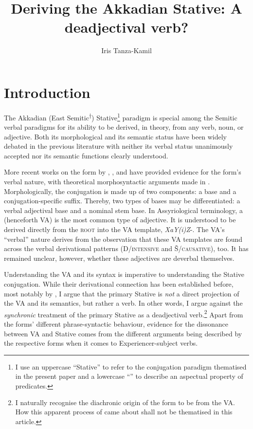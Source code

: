 \documentclass[output=paper,colorlinks,citecolor=brown]{langscibook}
\author{Iris Tanza-Kamil\orcid{}\affiliation{The Hebrew University of Jerusalem}}
\title{Deriving the Akkadian Stative: A deadjectival verb?}
\begin{document}
\maketitle


\section{Introduction}
\label{sec:introduction}

The Akkadian (East Semitic\textsuperscript{$\dagger$}) Stative\footnote{I use an uppercase “Stative” to refer to the conjugation paradigm thematised in the present paper and a lowercase “” to describe an aspectual property of predicates.} paradigm is special among the Semitic verbal paradigms for its ability to be derived, in theory, from any verb, noun, or adjective. Both its morphological and its semantic status have been widely debated in the previous literature with neither its verbal status unanimously accepted nor its semantic functions clearly understood.

More recent works on the form by \citet{kouwenberg_nouns_2000}, \citet{carver_akkadian_2016}, and \citet{kamil2023stative} have provided evidence for the form's verbal nature, with theoretical morphosyntactic arguments made in \citet{kamil2023stative}. Morphologically, the conjugation is made up of two components: a base and a conjugation-specific suffix. Thereby, two types of bases may be differentiated: a verbal adjectival base and a nominal stem base. In Assyriological terminology, a  (henceforth VA) is the most common type of adjective. It is understood to be derived directly from the \textsc{root} into the VA template, \textit{XaY(i)Z}-. The VA's “verbal” nature derives from the observation that these VA templates are found across the verbal derivational patterns (D/\textsc{intensive} and Š/\textsc{causative}), too. It has remained unclear, however, whether these adjectives are deverbal themselves.

Understanding the VA and its syntax is imperative to understanding the Stative conjugation. While their derivational connection has been established before, most notably by \citet{huehnergard_stative_1987}, I argue that the primary Stative  is \textit{not} a direct projection of the VA and its semantics, but rather a  verb. In other words, I argue against the \textit{synchronic} treatment of the primary Stative  as a deadjectival verb.\footnote{I naturally recognise the diachronic origin of the form to be from the VA. How this apparent process of  came about shall not be thematised in this article.} Apart from the forms' different phrase-syntactic behaviour, evidence for the dissonance between VA and Stative comes from the different arguments being described by the respective forms when it comes to Experiencer-subject verbs.
\end{document}
